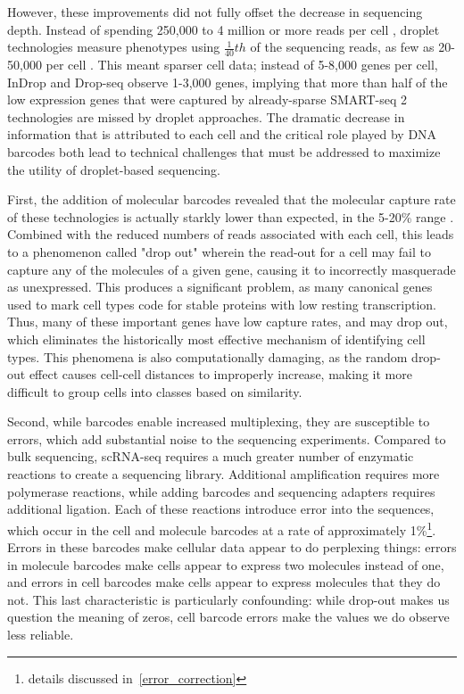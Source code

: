 However, these improvements did not fully offset the decrease in sequencing depth.
Instead of spending 250,000 to 4 million or more reads per cell \citep{Shalek2013,Shalek2014,Jaitin2014}, droplet technologies measure phenotypes using $\frac{1}{40}th$ of the sequencing reads, as few as 20-50,000 per cell \citep{Klein2015,Macosko2015}.
This meant sparser cell data; instead of 5-8,000 genes per cell, InDrop and Drop-seq observe 1-3,000 genes, implying that more than half of the low expression genes that were captured by already-sparse SMART-seq 2 technologies are missed by droplet approaches.
The dramatic decrease in information that is attributed to each cell and the critical role played by DNA barcodes both lead to technical challenges that must be addressed to maximize the utility of droplet-based sequencing. 

First, the addition of molecular barcodes revealed that the molecular capture rate of these technologies is actually starkly lower than expected, in the 5-20\% range \citep{Shah2016}. 
Combined with the reduced numbers of reads associated with each cell, this leads to a phenomenon called "drop out" wherein the read-out for a cell may fail to capture any of the molecules of a given gene, causing it to incorrectly masquerade as unexpressed. 
This produces a significant problem, as many canonical genes used to mark cell types code for stable proteins with low resting transcription. 
Thus, many of these important genes have low capture rates, and may drop out, which eliminates the historically most effective mechanism of identifying cell types. 
This phenomena is also computationally damaging, as the random drop-out effect causes cell-cell distances to improperly increase, making it more difficult to group cells into classes based on similarity. 

Second, while barcodes enable increased multiplexing, they are susceptible to errors, which add substantial noise to the sequencing experiments. 
Compared to bulk sequencing, scRNA-seq requires a much greater number of enzymatic reactions to create a sequencing library. 
Additional amplification requires more polymerase reactions, while adding barcodes and sequencing adapters requires additional ligation. 
Each of these reactions introduce error into the sequences, which occur in the cell and molecule barcodes at a rate of approximately 1\%\footnote{details discussed in~\ref{error_correction}}.
Errors in these barcodes make cellular data appear to do perplexing things: errors in molecule barcodes make cells appear to express two molecules instead of one, and errors in cell barcodes make cells appear to express molecules that they do not. 
This last characteristic is particularly confounding: while drop-out makes us question the meaning of zeros, cell barcode errors make the values we do observe less reliable. 


